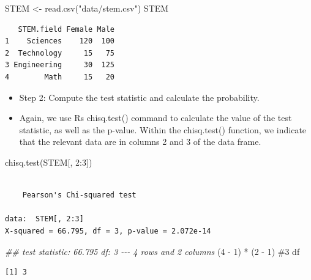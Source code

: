 \documentclass[
  letterpaper,
  DIV=11,
  numbers=noendperiod]{scrreprt}
\newenvironment{Shaded}{\begin{snugshade}}{\end{snugshade}}
\newcommand{\CommentTok}[1]{\textcolor[rgb]{0.37,0.37,0.37}{#1}}
\newcommand{\DecValTok}[1]{\textcolor[rgb]{0.68,0.00,0.00}{#1}}
\newcommand{\DocumentationTok}[1]{\textcolor[rgb]{0.37,0.37,0.37}{\textit{#1}}}
\newcommand{\FunctionTok}[1]{\textcolor[rgb]{0.28,0.35,0.67}{#1}}
\newcommand{\NormalTok}[1]{\textcolor[rgb]{0.00,0.23,0.31}{#1}}
\newcommand{\OtherTok}[1]{\textcolor[rgb]{0.00,0.23,0.31}{#1}}
\newcommand{\SpecialCharTok}[1]{\textcolor[rgb]{0.37,0.37,0.37}{#1}}
\newcommand{\StringTok}[1]{\textcolor[rgb]{0.13,0.47,0.30}{#1}}
\providecommand{\tightlist}{%
  \setlength{\itemsep}{0pt}\setlength{\parskip}{0pt}}\usepackage{longtable,booktabs,array}
\begin{document}
\begin{Shaded}
\begin{Highlighting}[]
\NormalTok{STEM }\OtherTok{\textless{}{-}} \FunctionTok{read.csv}\NormalTok{(}\StringTok{"data/stem.csv"}\NormalTok{)}
\NormalTok{STEM}
\end{Highlighting}
\end{Shaded}

\begin{verbatim}
   STEM.field Female Male
1    Sciences    120  100
2  Technology     15   75
3 Engineering     30  125
4        Math     15   20
\end{verbatim}

\begin{itemize}
\tightlist
\item
  Step 2: Compute the test statistic and calculate the probability.
\item
  Again, we use Rs chisq.test() command to calculate the value of the
  test statistic, as well as the p-value. Within the chisq.test()
  function, we indicate that the relevant data are in columns 2 and 3 of
  the data frame.
\end{itemize}

\begin{Shaded}
\begin{Highlighting}[]
\FunctionTok{chisq.test}\NormalTok{(STEM[, }\DecValTok{2}\SpecialCharTok{:}\DecValTok{3}\NormalTok{])}
\end{Highlighting}
\end{Shaded}

\begin{verbatim}

    Pearson's Chi-squared test

data:  STEM[, 2:3]
X-squared = 66.795, df = 3, p-value = 2.072e-14
\end{verbatim}

\begin{Shaded}
\begin{Highlighting}[]
\DocumentationTok{\#\# test statistic: 66.795 df: 3 {-}{-}{-} 4 rows and 2 columns}
\NormalTok{(}\DecValTok{4} \SpecialCharTok{{-}} \DecValTok{1}\NormalTok{) }\SpecialCharTok{*}\NormalTok{ (}\DecValTok{2} \SpecialCharTok{{-}} \DecValTok{1}\NormalTok{)  }\CommentTok{\#3 df}
\end{Highlighting}
\end{Shaded}

\begin{verbatim}
[1] 3
\end{verbatim}
\end{document}
